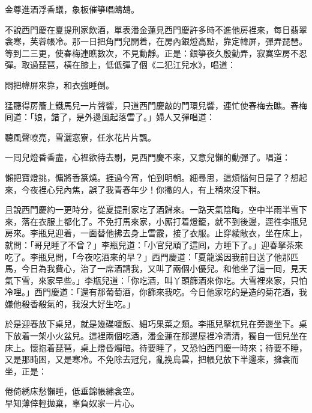 \begin{myquote}
金尊進酒浮香蟻，象板催箏唱鷓鴣。
\end{myquote}

不說西門慶在夏提刑家飲酒，單表潘金蓮見西門慶許多時不進他房裡來，每日翡翠衾寒，芙蓉帳冷。那一日把角門兒開着，在房內銀燈高點，靠定幃屏，彈弄琵琶。等到二三更，使春梅連瞧數次，不見動靜。正是：銀箏夜久殷勤弄，寂寞空房不忍彈。取過琵琶，橫在膝上，低低彈了個《二犯江兒水》，唱道：

\begin{myquote}
悶把幃屏來靠，和衣強睡倒。
\end{myquote}

猛聽得房簷上鐵馬兒一片聲響，只道西門慶敲的門環兒響，連忙使春梅去瞧。春梅囘道：「娘，錯了，是外邊風起落雪了。」{}婦人又彈唱道：

\begin{myquote}
聽風聲嘹亮，雪灑窓寮，任氷花片片飄。
\end{myquote}

一囘兒燈昏香盡，心裡欲待去剔，見西門慶不來，又意兒懶的動彈了。唱道：

\begin{myquote}
懶把寶燈挑，慵將香篆燒。捱過今宵，怕到明朝。細尋思，這煩惱何日是了？想起來，今夜裡心兒內焦，誤了我青春年少！你撇的人，有上稍來沒下稍。
\end{myquote}

且說西門慶約一更時分，從夏提刑家吃了酒歸來。一路天氣陰晦，空中半雨半雪下來，落在衣服上都化了。不免打馬來家，小厮打着燈籠，就不到後邊，逕徃李瓶兒房來。李瓶兒迎着，一面替他拂去身上雪霰，接了衣服。止穿綾敞衣，坐在床上，就問：「哥兒睡了不曾？」李瓶兒道：「小官兒頑了這囘，方睡下了。」迎春拏茶來吃了。李瓶兒問，「今夜吃酒來的早？」西門慶道：「夏龍溪因我前日送了他那匹馬，今日為我費心，治了一席酒請我，又叫了兩個小優兒。和他坐了這一囘，見天氣下雪，來家早些。」李瓶兒道：「你吃酒，叫丫頭篩酒來你吃。大雪裡來家，只怕冷哩。」西門慶道：「還有那葡萄酒，你篩來我吃。今日他家吃的是造的菊花酒，我嫌他殽香殽氣的，我沒大好生吃。」

於是迎春放下桌兒，就是幾碟嗄飯、細巧果菜之類。李瓶兒拏杌兒在旁邊坐下。桌下放着一架小火盆兒。這裡兩個吃酒，潘金蓮在那邊屋裡冷清清，獨自一個兒坐在床上。懷抱着琵琶，桌上燈昏燭暗。待要睡了，又恐怕西門慶一時來；待要不睡，又是那盹困，又是寒冷。不免除去冠兒，亂挽烏雲，把帳兒放下半邊來，擁衾而坐，正是：

\begin{myquote}
倦倚綉床愁懶睡，低垂錦帳繡衾空。\\早知薄倖輕拋棄，辜負奴家一片心。
\end{myquote}

